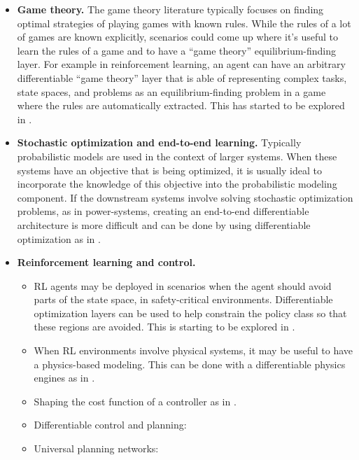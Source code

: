 \begin{itemize}
\item \textbf{Game theory.}
  The game theory literature typically focuses on finding
  optimal strategies of playing games with known rules.
  While the rules of a lot of games are known explicitly,
  scenarios could come up where it's useful to learn the
  rules of a game and to have a ``game theory''
  equilibrium-finding layer.
  For example in reinforcement learning, an agent can have an
  arbitrary differentiable ``game theory'' layer that is able
  of representing complex tasks, state spaces, and
  problems as an equilibrium-finding problem in a game
  where the rules are automatically extracted.
  This has started to be explored in
  \citet{ling2018game}.
\item \textbf{Stochastic optimization and end-to-end learning.}
  Typically probabilistic models are used in the context of
  larger systems. When these systems have an objective
  that is being optimized, it is usually ideal to incorporate
  the knowledge of this objective into the probabilistic modeling
  component.
  If the downstream systems involve solving
  stochastic optimization problems, as in power-systems,
  creating an end-to-end differentiable architecture is
  more difficult and can be done by using
  differentiable optimization as in \citet{donti2017task}.
\item \textbf{Reinforcement learning and control.}
  \begin{itemize}
  \item RL agents may be deployed in scenarios when
    the agent should avoid parts of the state space,
    \eg in safety-critical environments.
    Differentiable optimization layers can be used
    to help constrain the policy class so that these
    regions are avoided.
    This is starting to be explored in
    \citet{dalal2018safe,pham2018optlayer}.
  \item When RL environments involve physical systems,
    it may be useful to have a physics-based modeling.
    This can be done with a differentiable
    physics engines as in \citet{de2018end}.
  \item Shaping the cost function of a
    controller as in \citet{tamar2017learning}.
  \item Differentiable control and planning:
    \citet{chen2018optimal,chen2018approximating,karkus2018integrating}
  \item Universal planning networks: \citet{srinivas2018universal}
  \end{itemize}

\end{itemize}
